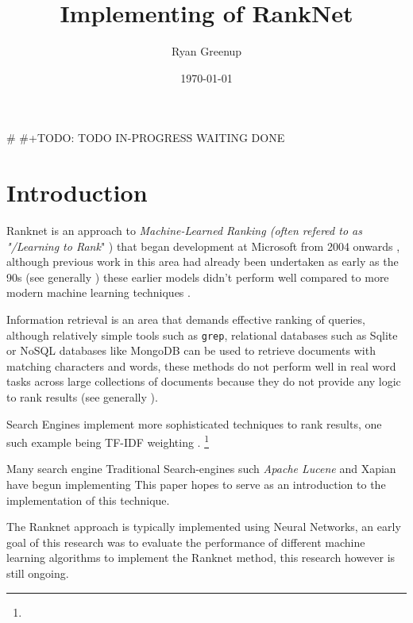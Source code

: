 \documentclass[a4paper,11pt,twoside]{article}
\author{Ryan Greenup}
\date{\today}
\title{Implementing of RankNet}
\begin{document}
\maketitle
\tableofcontents

\# \#+TODO: TODO IN-PROGRESS WAITING DONE
 \newpage 

\section{Introduction}
\label{sec:orga023947}
Ranknet is an approach to \emph{Machine-Learned Ranking (often refered to
as "\emph{/Learning to Rank}}" \cite{liuLearningRankInformation2009}) that
began development at Microsoft from 2004 onwards
\cite{christopherburgesRankNetRankingRetrospective2015}, although
previous work in this area had already been undertaken as early as
the 90s (see generally
\cite{fuhrProbabilisticModelsInformation1992,fuhrOptimumPolynomialRetrieval1989,fuhrProbabilisticModelsInformation1992,geyInferringProbabilityRelevance1994,wongLinearStructureInformation1988})
these earlier models didn't perform well compared to more modern
machine learning techniques
\cite[\S 15.5]{manningIntroductionInformationRetrieval2008}.

Information retrieval is an area that demands effective ranking of
queries, although relatively simple tools such as \texttt{grep}, relational databases
such as Sqlite or NoSQL databases like MongoDB can be used to
retrieve documents with matching characters and words, these methods
do not perform well in real word tasks across large collections of
documents because they do not provide any logic to rank results (see generally \cite{viksinghComparisonOpenSource2009}).

Search Engines implement more sophisticated techniques to rank
results, one such example being TF-IDF weighting
\cite{martyschochBleveSearchDocumentation}.  \footnote{}

Many search engine
Traditional Search-engines such \emph{Apache Lucene}
\cite{apachesoftwarefoundationLearningRankApache2017} and Xapian
\cite{jamesaylettGSoCProjectIdeasLearningtoRankStabilisationXapian2019}
have begun implementing 
This paper hopes to serve as an introduction to the implementation
of this technique.

The Ranknet approach is typically implemented using Neural Networks,
an early goal of this research was to evaluate the performance of
different machine learning algorithms to implement the Ranknet
method, this research however is still ongoing.
\end{document}
